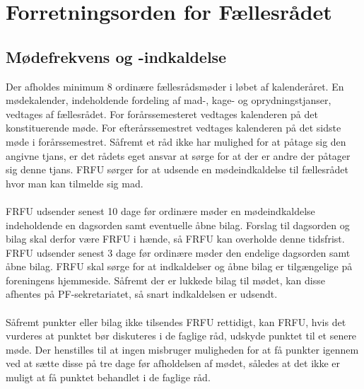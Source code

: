 \section{Forretningsorden for Fællesrådet}

\subsection{Mødefrekvens og -indkaldelse}
Der afholdes minimum 8 ordinære fællesrådsmøder i løbet af kalenderåret. En mødekalender, indeholdende fordeling af mad-, kage- og oprydningstjanser, vedtages af fællesrådet. For forårssemesteret vedtages kalenderen på det konstituerende møde. For efterårssemestret vedtages kalenderen på det sidste møde i forårssemestret. Såfremt et råd ikke har mulighed for at påtage sig den angivne tjans, er det rådets eget ansvar at sørge for at der er andre der påtager sig denne tjans. FRFU sørger for at udsende en mødeindkaldelse til fællesrådet hvor man kan tilmelde sig mad.\\
\\
FRFU udsender senest 10 dage før ordinære møder en mødeindkaldelse indeholdende en dagsorden samt eventuelle åbne
bilag. Forslag til dagsorden og bilag skal derfor være FRFU i hænde, så FRFU kan overholde denne tidsfrist. FRFU udsender senest 3 dage før ordinære møder den endelige dagsorden samt åbne bilag. FRFU skal sørge for at indkaldelser og åbne bilag er tilgængelige på foreningens hjemmeside. Såfremt der er lukkede bilag til mødet, kan disse afhentes på PF-sekretariatet, så snart indkaldelsen er udsendt.
\\
\\
Såfremt punkter eller bilag ikke tilsendes FRFU rettidigt, kan FRFU, hvis det vurderes at punktet bør diskuteres i de faglige råd, udskyde punktet til et senere møde. Der henstilles til at ingen misbruger muligheden for at få punkter igennem ved at sætte disse på tre dage før afholdelsen af mødet, således at det ikke er muligt at få punktet behandlet i de faglige råd.

